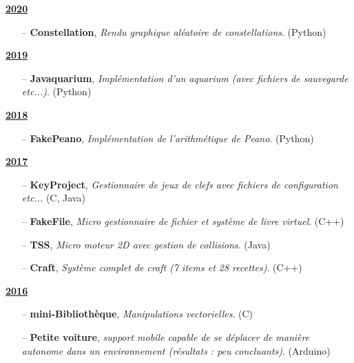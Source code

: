 \documentclass[10pt]{article}
\begin{document}
	\underline{\textbf{\large{2020}}}
	\\[-0.6cm]	
	
		\begin{itemize}[itemsep = -0.75 mm]
			\item[--] \noindent \textbf{Constellation}, \textit{Rendu graphique aléatoire de constellations}. (Python)
		\end{itemize}
	
	\underline{\textbf{\large{2019}}}
	\\[-0.6cm]	
	
		\begin{itemize}[itemsep = -0.75 mm]
			\item[--] \noindent \textbf{Javaquarium}, \textit{Implémentation d'un aquarium (avec fichiers de sauvegarde etc...)}. (Python)
		\end{itemize}
	
	\underline{\textbf{\large{2018}}}
	\\[-0.6cm]	
	
		\begin{itemize}[itemsep = -0.75 mm]
			\item[--] \noindent \textbf{FakePeano}, \textit{Implémentation de l'arithmétique de Peano}. (Python)
		\end{itemize}
	
	\underline{\textbf{\large{2017}}}
	\\[-0.6cm]	
	
		\begin{itemize}[itemsep = -0.75 mm]
			\item[--] \noindent \textbf{KeyProject}, \textit{Gestionnaire de jeux de clefs avec fichiers de configuration etc...} (C, Java)
			\item[--] \noindent \textbf{FakeFile}, \textit{Micro gestionnaire de fichier et système de livre virtuel}. (C++)
			\item[--] \noindent \textbf{TSS}, \textit{Micro moteur 2D avec gestion de collisions}. (Java)
			\item[--] \noindent \textbf{Craft}, \textit{Système complet de craft (7 items et 28 recettes)}. (C++)
		\end{itemize}
	
	
	\underline{\textbf{\large{2016}}}
	\\[-0.6cm]	
	
		\begin{itemize}[itemsep = -0.75 mm]
			\item[--] \noindent \textbf{mini-Bibliothèque}, \textit{Manipulations vectorielles}. (C)
			\item[--] \noindent \textbf{Petite voiture}, \textit{support mobile capable de se déplacer de manière autonome dans un environnement (résultats : peu concluants)}. (Arduino)
		\end{itemize}
	
\end{document}

